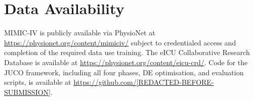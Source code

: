 \documentclass[a4paper,fleqn,longmktitle]{cas-sc}
\begin{document}
	
	
	\section*{Data Availability}
	
	MIMIC-IV is publicly available via PhysioNet at
	\url{https://physionet.org/content/mimiciv/} subject to credentialed
	access and completion of the required data use training.
	The eICU Collaborative Research Database is available at
	\url{https://physionet.org/content/eicu-crd/}.
	Code for the JUCO framework, including all four phases, DE optimisation,
	and evaluation scripts, is available at
	\url{https://github.com/[REDACTED-BEFORE-SUBMISSION]}.
	

	
	
	
	
\end{document}
